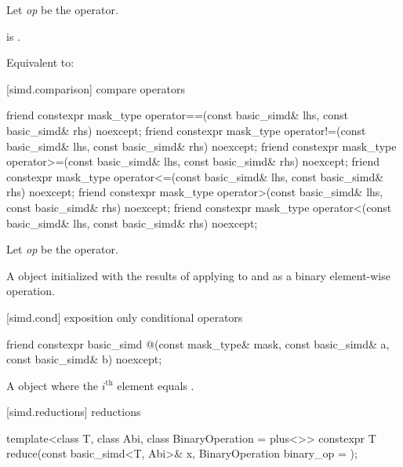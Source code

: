 \begin{itemdescr}
  \pnum Let \textit{op} be the operator.

  \pnum\constraints
   is .

  \pnum\effects
  Equivalent to: 
\end{itemdescr}

[simd.comparison]{ compare operators}

\begin{itemdecl}
friend constexpr mask_type operator==(const basic_simd& lhs, const basic_simd& rhs) noexcept;
friend constexpr mask_type operator!=(const basic_simd& lhs, const basic_simd& rhs) noexcept;
friend constexpr mask_type operator>=(const basic_simd& lhs, const basic_simd& rhs) noexcept;
friend constexpr mask_type operator<=(const basic_simd& lhs, const basic_simd& rhs) noexcept;
friend constexpr mask_type operator>(const basic_simd& lhs, const basic_simd& rhs) noexcept;
friend constexpr mask_type operator<(const basic_simd& lhs, const basic_simd& rhs) noexcept;
\end{itemdecl}

\begin{itemdescr}
  \pnum Let \textit{op} be the operator.

  \pnum\ConstraintOperatorTWellFormed

  \pnum\returns
  A  object initialized with the results of applying \op{} to  and
   as a binary element-wise operation.
\end{itemdescr}

[simd.cond]{ exposition only conditional operators}

\begin{itemdecl}
friend constexpr basic_simd
@\simdselect@(const mask_type& mask, const basic_simd& a, const basic_simd& b) noexcept;
\end{itemdecl}

\begin{itemdescr}
  \pnum\returns
  A  object where the $i^\text{th}$ element equals  \foralli.
\end{itemdescr}

[simd.reductions]{ reductions}

\begin{itemdecl}
template<class T, class Abi, class BinaryOperation = plus<>>
  constexpr T reduce(const basic_simd<T, Abi>& x, BinaryOperation binary_op = {});
\end{itemdecl}

